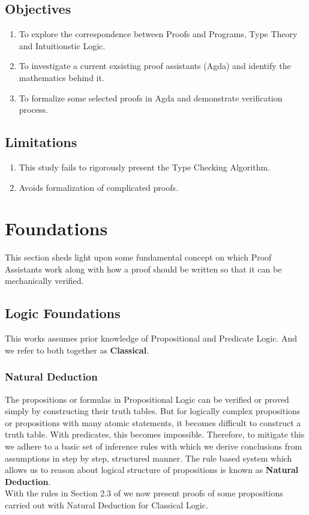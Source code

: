 \documentclass[12pt]{article}
\begin{document}
\subsection{Objectives}
\begin{enumerate}
    \item To explore the correspondence between Proofs and Programs, Type Theory and Intuitionstic Logic.
    \item To investigate a current exsisting proof assistants (Agda) and identify the mathematics behind it.
    \item To formalize some selected proofs in Agda and demonstrate verification process.
\end{enumerate}

\subsection{Limitations}
\begin{enumerate}
    \item This study fails to rigorously present the Type Checking Algorithm.
    \item Avoids formalization of complicated proofs.
\end{enumerate}




\section{Foundations}
This section sheds light upon some fundamental concept on which Proof Assistants work along with how a proof should be written so that it can be mechanically verified.
\subsection{Logic Foundations}
This works assumes prior knowledge of Propositional and Predicate Logic. And we refer to both together as \textbf{Classical}.
\subsubsection{Natural Deduction}
The propositions or formulas in Propositional Logic can be verified or proved simply by constructing their truth tables. But for logically complex propositions or propositions with many atomic statements, it becomes difficult to construct a truth table. With predicates, this becomes impossible. Therefore, to mitigate this we adhere to a basic set of inference rules with which we derive conclusions from assumptions in step by step, structured manner. The rule based system which allows us to reason about logical structure of propositions is known as \textbf{Natural Deduction}. \\
With the rules in Section 2.3 of \cite{Alrubyli2021}  we now present proofs of some propositions carried out with Natural Deduction for Classical Logic.
\end{document}

